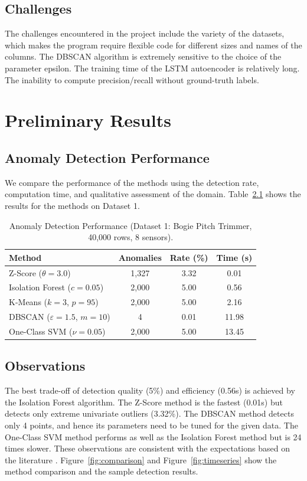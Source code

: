 \documentclass{CLS_zhou430}
\begin{document}
\section{Challenges}
The challenges encountered in the project include the variety of the datasets, which makes the program require flexible code for different sizes and names of the columns. The DBSCAN algorithm is extremely sensitive to the choice of the parameter epsilon. The training time of the LSTM autoencoder is relatively long. The inability to compute precision/recall without ground-truth labels.


\chapter{Preliminary Results}

\section{Anomaly Detection Performance}
We compare the performance of the methods using the detection rate, computation time, and qualitative assessment of the domain. Table~\ref{tab:metrics} shows the results for the methods on Dataset 1.

\begin{table}[h]
    \centering
    \caption{Anomaly Detection Performance (Dataset 1: Bogie Pitch Trimmer, 40,000 rows, 8 sensors).}
    \begin{tabular}{|l|c|c|c|}
        \hline \hline
        Method & Anomalies & Rate (\%) & Time (s) \\ \hline
        Z-Score ($\theta=3.0$) & 1,327 & 3.32 & 0.01 \\ \hline
        Isolation Forest ($c=0.05$) & 2,000 & 5.00 & 0.56 \\ \hline
        K-Means ($k=3$, $p=95$) & 2,000 & 5.00 & 2.16 \\ \hline
        DBSCAN ($\varepsilon=1.5$, $m=10$) & 4 & 0.01 & 11.98 \\ \hline
        One-Class SVM ($\nu=0.05$) & 2,000 & 5.00 & 13.45 \\ \hline
        \hline
    \end{tabular}
    \label{tab:metrics}
\end{table}

\section{Observations}
The best trade-off of detection quality (5\%) and efficiency (0.56s) is achieved by the Isolation Forest algorithm. The Z-Score method is the fastest (0.01s) but detects only extreme univariate outliers (3.32\%). The DBSCAN method detects only 4 points, and hence its parameters need to be tuned for the given data. The One-Class SVM method performs as well as the Isolation Forest method but is 24 times slower. These observations are consistent with the expectations based on the literature \cite{liu2008isolation, ester1996density, scholkopf2001estimating}. Figure~\ref{fig:comparison} and Figure~\ref{fig:timeseries} show the method comparison and the sample detection results.
\end{document}
